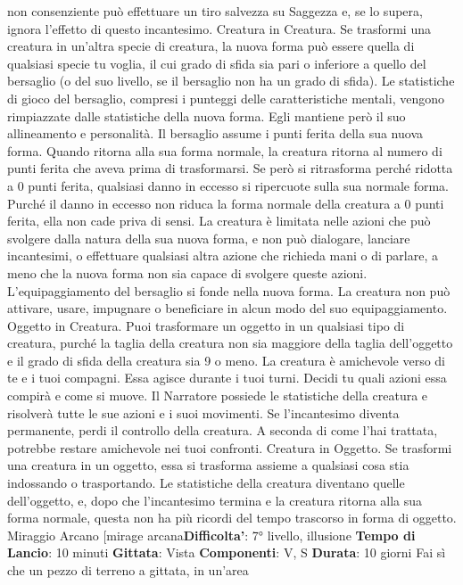 \begin{multicols}{2}
non consenziente può effettuare un tiro salvezza su
Saggezza e, se lo supera, ignora l’effetto di questo
incantesimo.
Creatura in Creatura. Se trasformi una creatura in
un’altra specie di creatura, la nuova forma può essere
quella di qualsiasi specie tu voglia, il cui grado di sfida
sia pari o inferiore a quello del bersaglio (o del suo
livello, se il bersaglio non ha un grado di sfida). Le
statistiche di gioco del bersaglio, compresi i punteggi
delle caratteristiche mentali, vengono rimpiazzate dalle
statistiche della nuova forma. Egli mantiene però il suo
allineamento e personalità.
Il bersaglio assume i punti ferita della sua nuova forma.
Quando ritorna alla sua forma normale, la creatura
ritorna al numero di punti ferita che aveva prima di
trasformarsi. Se però si ritrasforma perché ridotta a 0
punti ferita, qualsiasi danno in eccesso si ripercuote
sulla sua normale forma. Purché il danno in eccesso
non riduca la forma normale della creatura a 0 punti
ferita, ella non cade priva di sensi.
La creatura è limitata nelle azioni che può svolgere
dalla natura della sua nuova forma, e non può
dialogare, lanciare incantesimi, o effettuare qualsiasi
altra azione che richieda mani o di parlare, a meno che
la nuova forma non sia capace di svolgere queste
azioni.
L’equipaggiamento del bersaglio si fonde nella nuova
forma. La creatura non può attivare, usare, impugnare o
beneficiare in alcun modo del suo equipaggiamento.
Oggetto in Creatura. Puoi trasformare un oggetto in un
qualsiasi tipo di creatura, purché la taglia della creatura
non sia maggiore della taglia dell’oggetto e il grado di
sfida della creatura sia 9 o meno. La creatura è
amichevole verso di te e i tuoi compagni. Essa agisce
durante i tuoi turni. Decidi tu quali azioni essa compirà e
come si muove. Il Narratore possiede le statistiche della
creatura e risolverà tutte le sue azioni e i suoi
movimenti.
Se l’incantesimo diventa permanente, perdi il controllo
della creatura. A seconda di come l’hai trattata,
potrebbe restare amichevole nei tuoi confronti.
Creatura in Oggetto. Se trasformi una creatura in un
oggetto, essa si trasforma assieme a qualsiasi cosa stia
indossando o trasportando. Le statistiche della creatura
diventano quelle dell’oggetto, e, dopo che l’incantesimo
termina e la creatura ritorna alla sua forma normale,
questa non ha più ricordi del tempo trascorso in forma
di oggetto.
Miraggio Arcano
[mirage arcana\textbf{Difficolta'}:
7° livello, illusione
\textbf{Tempo di Lancio}: 10 minuti
\textbf{Gittata}: Vista
\textbf{Componenti}: V, S
\textbf{Durata}: 10 giorni
Fai sì che un pezzo di terreno a gittata, in un’area

\end{multicols}

